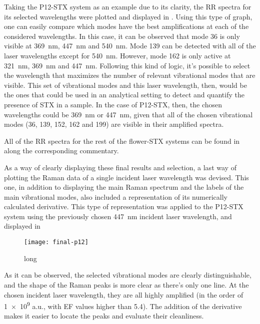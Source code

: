 Taking the P12-STX system as an example due to its clarity, the RR spectra for its selected wavelengths were plotted and displayed in .
Using this type of graph, one can easily compare which modes have the best amplifications at each of the considered wavelengths.
In this case, it can be observed that mode 36 is only visible at \SI{369}{\nano\metre}, \SI{447}{\nano\metre} and \SI{540}{\nano\metre}.
Mode 139 can be detected with all of the laser wavelengths except for \SI{540}{\nano\metre}.
However, mode 162 is only active at \SI{321}{\nano\metre}, \SI{369}{\nano\metre} and \SI{447}{\nano\metre}.
Following this kind of logic, it's possible to select the wavelength that maximizes the number of relevant vibrational modes that are visible.
This set of vibrational modes and this laser wavelength, then, would be the ones that could be used in an analytical setting to detect and quantify the presence of STX in a sample.
In the case of P12-STX, then, the chosen wavelengths could be \SI{369}{\nano\meter} or \SI{447}{\nano\meter}, given that all of the chosen vibrational modes (\num{36}, \num{139}, \num{152}, \num{162} and \num{199}) are visible in their amplified spectra.

All of the RR spectra for the rest of the flower-STX systems can be found in  along the corresponding commentary.

As a way of clearly displaying these final results and selection, a last way of plotting the Raman data of a single incident laser wavelength was devised.
This one, in addition to displaying the main Raman spectrum and the labels of the main vibrational modes, also included a representation of its numerically calculated derivative.
This type of representation was applied to the P12-STX system using the previously chosen \SI{447}{\nano\meter} incident laser wavelength, and displayed in 

\begin{figure*}[h]
    \texttt{[image: final-p12]}
    \caption[short]{long}
\end{figure*}

As it can be observed, the selected vibrational modes are clearly distinguishable, and the shape of the Raman peaks is more clear as there's only one line.
At the chosen incident laser wavelength, they are all highly amplified (in the order of \num{1e9} a.u., with EF values higher than \num{5.4}).
The addition of the derivative makes it easier to locate the peaks and evaluate their cleanliness.


